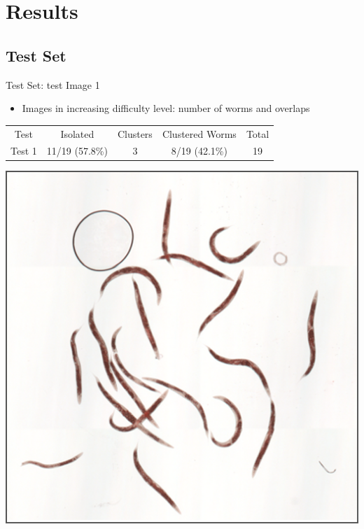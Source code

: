 \documentclass[xcolor=table]{beamer}
\begin{document}

\section{Results}
\subsection{Test Set}
\begin{frame}{Test Set: test Image 1}

  \begin{itemize}
  \item Images in increasing difficulty level: number of worms
    and overlaps
  \end{itemize}

\begin{table}[h]
\begin{center}
\begin{tabular}[h]{|c|c|c|c|c|}
    \hline
    \rowcolor{gray!35}
    Test & Isolated & Clusters & Clustered Worms & Total\\
    Test 1 & 11/19 (57.8\%) & 3 & 8/19 (42.1\%) & 19 \\
    \hline
  \end{tabular}
\end{center}
\end{table}

\begin{center}
\includegraphics[scale=0.25]{results/test1/original}
\end{center}

\end{frame}
\end{document}
